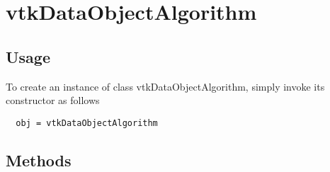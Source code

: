\section{vtkDataObjectAlgorithm}

\subsection{Usage}


To create an instance of class vtkDataObjectAlgorithm, simply
invoke its constructor as follows
\begin{verbatim}
  obj = vtkDataObjectAlgorithm
\end{verbatim}
\subsection{Methods}


